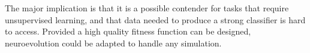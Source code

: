 \documentclass[12pt,a4paper]{article}
\begin{document}
    The major implication is that it is a possible contender for tasks that require unsupervised learning, and that data needed to produce a strong classifier is hard to access. Provided a high quality fitness function can be designed, neuroevolution could be adapted to handle any simulation.


\end{document}
